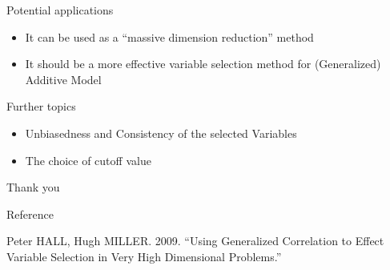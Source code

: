 \documentclass[ignorenonframetext,]{beamer}
\providecommand{\tightlist}{%
  \setlength{\itemsep}{0pt}\setlength{\parskip}{0pt}}
\begin{document}
\begin{frame}{Potential applications}

\begin{itemize}
\tightlist
\item
  It can be used as a ``massive dimension reduction'' method
\item
  It should be a more effective variable selection method for
  (Generalized) Additive Model
\end{itemize}

\end{frame}

\begin{frame}{Further topics}

\begin{itemize}
\tightlist
\item
  Unbiasedness and Consistency of the selected Variables\\
\item
  The choice of cutoff value
\end{itemize}

\end{frame}

\begin{frame}{}

\begin{center}
\Huge Thank you
\end{center}

\end{frame}

\begin{frame}{Reference}

\hypertarget{refs}{}
\hypertarget{ref-ref6}{}
Peter HALL, Hugh MILLER. 2009. ``Using Generalized Correlation to Effect
Variable Selection in Very High Dimensional Problems.''

\end{frame}
\end{document}
